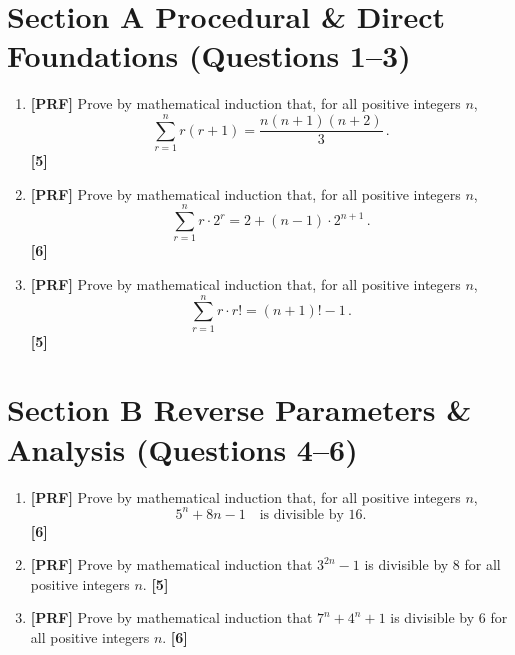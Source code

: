 \documentclass[11pt,a4paper]{article}
\begin{document}
\thispagestyle{plain}


\section*{Section A \quad Procedural \& Direct Foundations \hfill{\normalfont\footnotesize(Questions 1--3)}}
\begin{enumerate}
\item \textbf{[PRF]} Prove by mathematical induction that, for all positive integers $n$,
\[
\sum_{r=1}^{n} r(r+1) = \frac{n(n+1)(n+2)}{3}\,.
\]
\hfill{\small\textbf{[5]}}

\item \textbf{[PRF]} Prove by mathematical induction that, for all positive integers $n$,
\[
\sum_{r=1}^{n} r \cdot 2^r = 2 + (n-1) \cdot 2^{n+1}\,.
\]
\hfill{\small\textbf{[6]}}

\item \textbf{[PRF]} Prove by mathematical induction that, for all positive integers $n$,
\[
\sum_{r=1}^{n} r \cdot r! = (n+1)! - 1\,.
\]
\hfill{\small\textbf{[5]}}

\end{enumerate}

\section*{Section B \quad Reverse Parameters \& Analysis \hfill{\normalfont\small(Questions 4--6)}}
\begin{enumerate}[resume]
\item \textbf{[PRF]} Prove by mathematical induction that, for all positive integers $n$,
\[
5^n + 8n - 1 \quad \text{is divisible by 16.}
\]
\hfill{\small\textbf{[6]}}

\item \textbf{[PRF]} Prove by mathematical induction that $3^{2n} - 1$ is divisible by $8$ for all positive integers $n$.
\hfill{\small\textbf{[5]}}

\item \textbf{[PRF]} Prove by mathematical induction that $7^n + 4^n + 1$ is divisible by $6$ for all positive integers $n$.
\hfill{\small\textbf{[6]}}

\end{enumerate}
\end{document}
